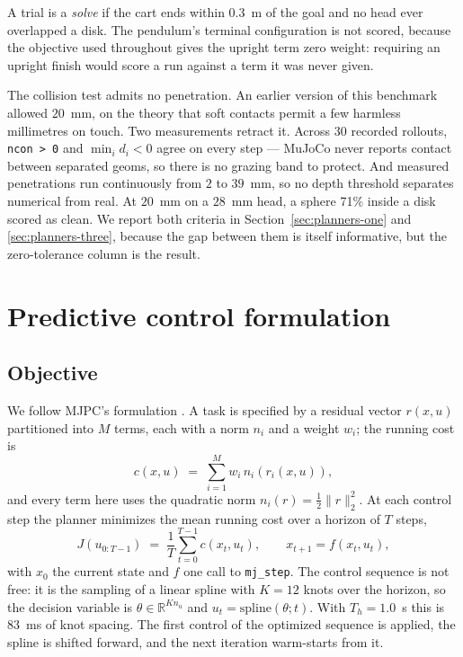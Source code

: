 \documentclass[conference]{IEEEtran}
\begin{document}
A trial is a \emph{solve} if the cart ends within $0.3$~m of the goal and no
head ever overlapped a disk. The pendulum's terminal configuration is not
scored, because the objective used throughout gives the upright term zero
weight: requiring an upright finish would score a run against a term it was
never given.

The collision test admits no penetration. An earlier version of this benchmark
allowed $20$~mm, on the theory that soft contacts permit a few harmless
millimetres on touch. Two measurements retract it. Across 30 recorded rollouts,
\texttt{ncon > 0} and $\min_i d_i < 0$ agree on every step --- MuJoCo never
reports contact between separated geoms, so there is no grazing band to protect.
And measured penetrations run continuously from $2$ to $39$~mm, so no depth
threshold separates numerical from real. At $20$~mm on a $28$~mm head, a sphere
71\% inside a disk scored as clean. We report both criteria in
Section~\ref{sec:planners-one} and \ref{sec:planners-three}, because the gap
between them is itself informative, but the zero-tolerance column is the result.

\section{Predictive control formulation}

\subsection{Objective}

We follow MJPC's formulation \cite{mjpc}. A task is specified by a residual
vector $r(x,u)$ partitioned into $M$ terms, each with a norm $n_i$ and a weight
$w_i$; the running cost is
\begin{equation}
c(x,u) \;=\; \sum_{i=1}^{M} w_i \, n_i\!\left(r_i(x,u)\right),
\label{eq:cost}
\end{equation}
and every term here uses the quadratic norm $n_i(r) = \tfrac{1}{2}\|r\|_2^2$.
At each control step the planner minimizes the mean running cost over a horizon
of $T$ steps,
\begin{equation}
J(u_{0:T-1}) \;=\; \frac{1}{T}\sum_{t=0}^{T-1} c(x_t, u_t),
\qquad x_{t+1} = f(x_t, u_t),
\label{eq:objective}
\end{equation}
with $x_0$ the current state and $f$ one call to \texttt{mj\_step}. The control
sequence is not free: it is the sampling of a linear spline with $K = 12$ knots
over the horizon, so the decision variable is $\theta \in \mathbb{R}^{K n_u}$
and $u_t = \mathrm{spline}(\theta; t)$. With $T_h = 1.0$~s this is $83$~ms of
knot spacing. The first control of the optimized sequence is applied, the spline
is shifted forward, and the next iteration warm-starts from it.
\end{document}
